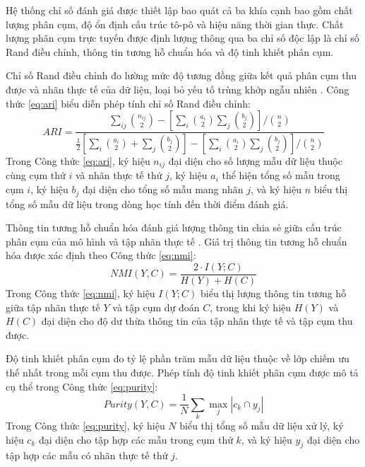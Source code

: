 Hệ thống chỉ số đánh giá được thiết lập bao quát cả ba khía cạnh bao gồm chất lượng phân cụm, độ ổn định cấu trúc tô-pô và hiệu năng thời gian thực. Chất lượng phân cụm trực tuyến được định lượng thông qua ba chỉ số độc lập là chỉ số Rand điều chỉnh, thông tin tương hỗ chuẩn hóa và độ tinh khiết phân cụm.

Chỉ số Rand điều chỉnh đo lường mức độ tương đồng giữa kết quả phân cụm thu được và nhãn thực tế của dữ liệu, loại bỏ yếu tố trùng khớp ngẫu nhiên \cite{hubert1985comparing}. Công thức \ref{eq:ari} biểu diễn phép tính chỉ số Rand điều chỉnh:
\begin{equation}
ARI = \frac{\sum_{ij} \binom{n_{ij}}{2} - \left[ \sum_i \binom{a_i}{2} \sum_j \binom{b_j}{2} \right] / \binom{n}{2}}{\frac{1}{2} \left[ \sum_i \binom{a_i}{2} + \sum_j \binom{b_j}{2} \right] - \left[ \sum_i \binom{a_i}{2} \sum_j \binom{b_j}{2} \right] / \binom{n}{2}}
\label{eq:ari}
\end{equation}
Trong Công thức \ref{eq:ari}, ký hiệu $n_{ij}$ đại diện cho số lượng mẫu dữ liệu thuộc cùng cụm thứ $i$ và nhãn thực tế thứ $j$, ký hiệu $a_i$ thể hiện tổng số mẫu trong cụm $i$, ký hiệu $b_j$ đại diện cho tổng số mẫu mang nhãn $j$, và ký hiệu $n$ biểu thị tổng số mẫu dữ liệu trong dòng học tính đến thời điểm đánh giá.

Thông tin tương hỗ chuẩn hóa đánh giá lượng thông tin chia sẻ giữa cấu trúc phân cụm của mô hình và tập nhãn thực tế \cite{strehl2002cluster}. Giá trị thông tin tương hỗ chuẩn hóa được xác định theo Công thức \ref{eq:nmi}:
\begin{equation}
NMI(Y, C) = \frac{2 \cdot I(Y; C)}{H(Y) + H(C)}
\label{eq:nmi}
\end{equation}
Trong Công thức \ref{eq:nmi}, ký hiệu $I(Y; C)$ biểu thị lượng thông tin tương hỗ giữa tập nhãn thực tế $Y$ và tập cụm dự đoán $C$, trong khi ký hiệu $H(Y)$ và $H(C)$ đại diện cho độ dư thừa thông tin của tập nhãn thực tế và tập cụm thu được.

Độ tinh khiết phân cụm đo tỷ lệ phần trăm mẫu dữ liệu thuộc về lớp chiếm ưu thế nhất trong mỗi cụm thu được. Phép tính độ tinh khiết phân cụm được mô tả cụ thể trong Công thức \ref{eq:purity}:
\begin{equation}
Purity(Y, C) = \frac{1}{N} \sum_{k} \max_{j} |c_k \cap y_j|
\label{eq:purity}
\end{equation}
Trong Công thức \ref{eq:purity}, ký hiệu $N$ biểu thị tổng số mẫu dữ liệu xử lý, ký hiệu $c_k$ đại diện cho tập hợp các mẫu trong cụm thứ $k$, và ký hiệu $y_j$ đại diện cho tập hợp các mẫu có nhãn thực tế thứ $j$.

